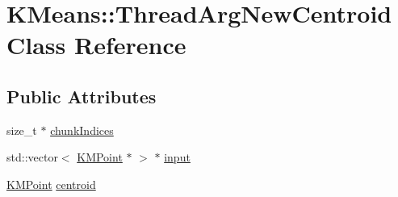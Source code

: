 \hypertarget{classKMeans_1_1ThreadArgNewCentroid}{\section{K\-Means\-:\-:Thread\-Arg\-New\-Centroid Class Reference}
\label{classKMeans_1_1ThreadArgNewCentroid}
}
\subsection*{Public Attributes}
\begin{DoxyCompactItemize}
\item 
size\-\_\-t $\ast$ \hyperlink{classKMeans_1_1ThreadArgNewCentroid_ac026174de7fc8a7ca4a0c5b20b9e971d}{chunk\-Indices}
\item 
std\-::vector$<$ \hyperlink{structKMeans_1_1KMPoint}{K\-M\-Point} $\ast$ $>$ $\ast$ \hyperlink{classKMeans_1_1ThreadArgNewCentroid_afefa482db4fb35d1f498fec601aaa5e3}{input}
\item 
\hyperlink{structKMeans_1_1KMPoint}{K\-M\-Point} \hyperlink{classKMeans_1_1ThreadArgNewCentroid_a3c916ccdf617487a5b91578572241a36}{centroid}
\end{DoxyCompactItemize}


